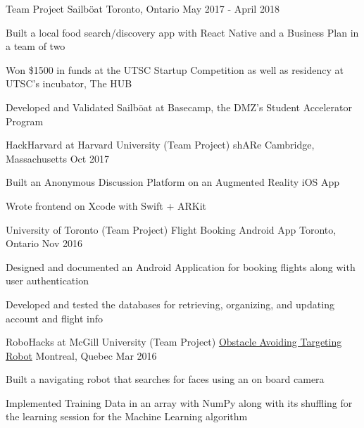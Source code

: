 \begin{cventries}
\cventry
    {Team Project}
    {Sailböat}
    {Toronto, Ontario}
    {May 2017 - April 2018}
    {
      \begin{cvitems}
        \item {Built a local food search/discovery app with React Native and a Business Plan in a team of two}
        \item {Won \$1500 in funds at the UTSC Startup Competition as well as residency at UTSC's incubator, The HUB}
        \item {Developed and Validated Sailböat at Basecamp, the DMZ's Student Accelerator Program}
      \end{cvitems}
    }
\cventry
    {HackHarvard at Harvard University (Team Project)}
    {shARe}
    {Cambridge, Massachusetts}
    {Oct 2017}
    {
      \begin{cvitems}
        \item {Built an Anonymous Discussion Platform on an Augmented Reality iOS App}
        \item {Wrote frontend on Xcode with Swift + ARKit}
      \end{cvitems}
    }
\cventry
    {University of Toronto (Team Project)}
    {Flight Booking Android App}
    {Toronto, Ontario}
    {Nov 2016}
    {
      \begin{cvitems}
        \item {Designed and documented an Android Application for booking flights along with user authentication}
        \item {Developed and tested the databases for retrieving, organizing, and updating account and flight info}
      \end{cvitems}
    }
\cventry
    {RoboHacks at McGill University (Team Project)}
    {\href{https://github.com/PhABC/HeadHunterBots}{Obstacle Avoiding Targeting Robot}}
    {Montreal, Quebec}
    {Mar 2016}
    {
      \begin{cvitems}
        \item {Built a navigating robot that searches for faces using an on board camera}
        \item {Implemented Training Data in an array with NumPy along with its shuffling for the learning session for the Machine Learning algorithm}
      \end{cvitems}
    }
\end{cventries}
